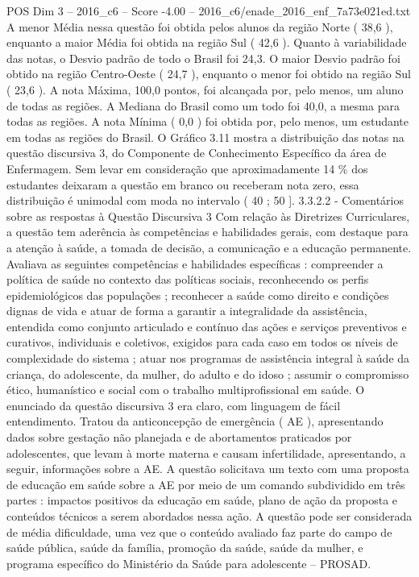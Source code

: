 \begin{textsample}{POS Dim 3 – 2016\_c6 – Score -4.00 – 2016\_c6/enade\_2016\_enf\_7a73e021ed.txt}
A menor Média nessa questão foi obtida pelos alunos da região Norte ( 38,6 ), enquanto a maior Média foi obtida na região Sul ( 42,6 ).
Quanto à variabilidade das notas, o Desvio padrão de todo o Brasil foi 24,3.
O maior Desvio padrão foi obtido na região Centro-Oeste ( 24,7 ), enquanto o menor foi obtido na região Sul ( 23,6 ).
A nota Máxima, 100,0 pontos, foi alcançada por, pelo menos, um aluno de todas as regiões.
A Mediana do Brasil como um todo foi 40,0, a mesma para todas as regiões.
A nota Mínima ( 0,0 ) foi obtida por, pelo menos, um estudante em todas as regiões do Brasil.
O Gráfico 3.11 mostra a distribuição das notas na questão discursiva 3, do Componente de Conhecimento Específico da área de Enfermagem.
Sem levar em consideração que aproximadamente 14 \% dos estudantes deixaram a questão em branco ou receberam nota zero, essa distribuição é unimodal com moda no intervalo ( 40 ; 50 ]. 3.3.2.2 - Comentários sobre as respostas à Questão Discursiva 3 Com relação às Diretrizes Curriculares, a questão tem aderência às competências e habilidades gerais, com destaque para a atenção à saúde, a tomada de decisão, a comunicação e a educação permanente.
Avaliava as seguintes competências e habilidades específicas : compreender a política de saúde no contexto das políticas sociais, reconhecendo os perfis epidemiológicos das populações ; reconhecer a saúde como direito e condições dignas de vida e atuar de forma a garantir a integralidade da assistência, entendida como conjunto articulado e contínuo das ações e serviços preventivos e curativos, individuais e coletivos, exigidos para cada caso em todos os níveis de complexidade do sistema ; atuar nos programas de assistência integral à saúde da criança, do adolescente, da mulher, do adulto e do idoso ; assumir o compromisso ético, humanístico e social com o trabalho multiprofissional em saúde.
O enunciado da questão discursiva 3 era claro, com linguagem de fácil entendimento.
Tratou da anticoncepção de emergência ( AE ), apresentando dados sobre gestação não planejada e de abortamentos praticados por adolescentes, que levam à morte materna e causam infertilidade, apresentando, a seguir, informações sobre a AE.
A questão solicitava um texto com uma proposta de educação em saúde sobre a AE por meio de um comando subdividido em três partes : impactos positivos da educação em saúde, plano de ação da proposta e conteúdos técnicos a serem abordados nessa ação.
A questão pode ser considerada de média dificuldade, uma vez que o conteúdo avaliado faz parte do campo de saúde pública, saúde da família, promoção da saúde, saúde da mulher, e programa específico do Ministério da Saúde para adolescente – PROSAD.

\end{textsample}

